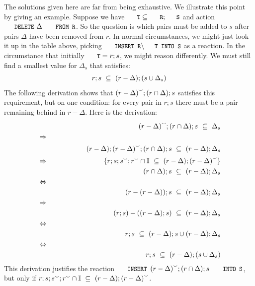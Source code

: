 \documentclass{svproc}
\begin{document}
	The solutions given here are far from being exhaustive.
	We illustrate this point by giving an example.
	Suppose we have $\code{T}\subs\code{R};\code{S}$ and action $\code{DELETE}\ \Delta\code{ FROM R}$.
	So the question is which pairs must be added to $s$ after pairs $\Delta$ have been removed from $r$.
	In normal circumstances, we might just look it up in the table above, picking $\code{INSERT R}\backslash\code{T INTO S}$ as a reaction.
	In the circumstance that initially $\code{T}=r;s$, we might reason differently.
	We must still find a smallest value for $\Delta_s$ that satisfies:
\begin{equation}
r;s\ \subs\ (r-\Delta);(s\cup\Delta_s)\label{lbl:nonshrinking r;s when Del from r}
\end{equation}
	The following derivation shows that ${(r-\Delta)}^\smallsmile;(r\cap\Delta);s$ satisfies this requirement,
	but on one condition: for every pair in $r;s$ there must be a pair remaining behind in $r-\Delta$.
	Here is the derivation:
\begin{eqnarray}
&&\flip{(r-\Delta)};(r\cap\Delta);s\ \subs\ \Delta_s\nonumber\\
&\Rightarrow\nonumber\\
&&(r-\Delta);\flip{(r-\Delta)};(r\cap\Delta);s\ \subs\ (r-\Delta);\Delta_s\nonumber\\
&\Rightarrow&\hspace{1in}\{r;s;\flip{s};\flip{r} \cap\iden\ \ \subs\ (r-\Delta);\flip{(r-\Delta)}\}\nonumber\\
&&(r\cap\Delta);s\ \subs\ (r-\Delta);\Delta_s\nonumber\\
&\Leftrightarrow\nonumber\\
&&(r-(r-\Delta));s\ \subs\ (r-\Delta);\Delta_s\nonumber\\
&\Rightarrow\nonumber\\
&&(r;s)-((r-\Delta);s)\ \subs\ (r-\Delta);\Delta_s\nonumber\\
&\Leftrightarrow\nonumber\\
&&r;s\ \subs\ (r-\Delta);s \cup (r-\Delta);\Delta_s\nonumber\\
&\Leftrightarrow\nonumber\\
&&r;s\ \subs\ (r-\Delta);(s \cup \Delta_s)\nonumber
\end{eqnarray}
	This derivation justifies the reaction $\code{INSERT }\flip{(r-\Delta)};(r\cap\Delta);s\code{ INTO S}$,
	but only if $r;s;\flip{s};\flip{r} \cap\iden\ \ \subs\ (r-\Delta);\flip{(r-\Delta)}$.
\end{document}
